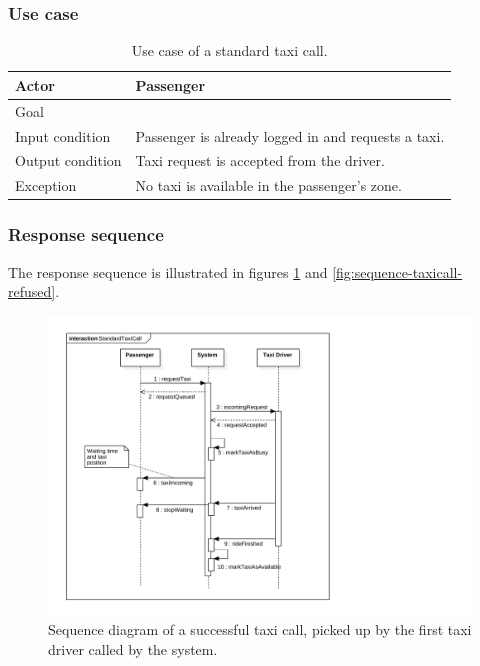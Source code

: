 \subsubsection{Use case}
\begin{table}[h]
\begin{center}
\begin{tabular}{| l | l |}
\hline
Actor & Passenger \\
\hline
Goal & %
\\
\hline
Input condition & Passenger is already logged in and requests a taxi.  \\
\hline
Output condition & Taxi request is accepted from the driver. \\
\hline
Exception & No taxi is available in the passenger's zone. \\
\hline
\end{tabular}
\end{center}
\caption{Use case of a standard taxi call.}
\end{table}

\subsubsection{Response sequence}
The response sequence is illustrated in figures \ref{fig:sequence-taxicall} and \ref{fig:sequence-taxicall-refused}.
\begin{figure}
\includegraphics[width=\textwidth]{diagrams/sequence_taxicall.pdf}
\caption{Sequence diagram of a successful taxi call, picked up by the first taxi driver called by the system.}
\label{fig:sequence-taxicall}
\end{figure}

